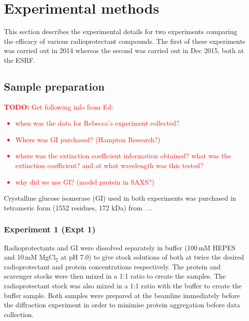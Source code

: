 \section{Experimental methods}
\label{sec:Experimental methods}
This section describes the experimental details for two experiments comparing the efficacy of various radioprotectant compounds.
The first of these experiments was carried out in 2014 whereas the second was carried out in Dec 2015, both at the ESRF.

\subsection{Sample preparation}
\label{sub:Sample preparation}
\textcolor{red}{
    \begin{myenumerate}
        \item \hypertarget{todo:Need info from Ed}{\textbf{TODO:} Get following info from Ed:}
        \begin{itemize}
            \item when was the data for Rebecca's experiment collected?
            \item Where was GI purchased? (Hampton Research?)
            \item where was the extinction coefficient information obtained? what was the extinction coefficient? and at what wavelength was this tested?
            \item why did we use GI? (model protein in SAXS?)
        \end{itemize}
    \end{myenumerate}
}
Crystalline glucose isomerase (GI) used in both experiments was purchased in tetrameric form (1552 residues, 172 kDa) from \textcolor{red}{...}.

\subsubsection{Experiment 1 (Expt 1)}
\label{subs:Experiment 1 - sample prep}
Radioprotectants and GI were dissolved separately in buffer (100$\,$mM HEPES and 10$\,$mM MgCl$_2$ at pH 7.0) to give stock solutions of both at twice the desired radioprotectant and protein concentrations respectively.
The protein and scavenger stocks were then mixed in a 1:1 ratio to create the samples.
The radioprotectant stock was also mixed in a 1:1 ratio with the buffer to create the buffer sample.
Both samples were prepared at the beamline immediately before the diffraction experiment in order to minimise protein aggregation before data collection.

